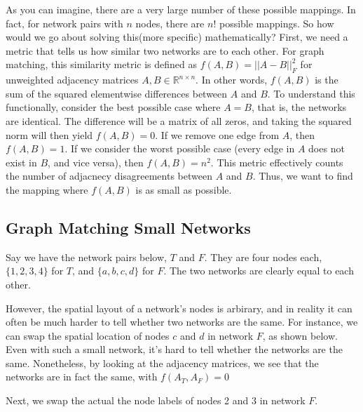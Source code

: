 \documentclass[letterpaper,10pt,english]{jupyterBook}
\begin{document}
\sphinxAtStartPar
As you can imagine, there are a very large number of these possible mappings. In fact, for network pairs with \(n\) nodes, there are \(n!\) possible mappings. So how would we go about solving this(more specific) mathematically? First, we need a metric that tells us how similar two networks are to each other. For graph matching, this similarity metric is defined as \(f(A, B) = ||A - B||_F^2\) for unweighted adjacency matrices \(A, B \in \mathbb{R}^{n \times n}\). In other words, \(f(A, B)\) is the sum of the squared elementwise differences between \(A\) and \(B\). To understand this functionally, consider the best possible case where \(A=B\), that is, the networks are identical. The difference will be a matrix of all zeros, and taking the squared norm will then yield \(f(A,B) = 0\). If we remove one edge from \(A\), then \(f(A,B) = 1\). If we consider the worst possible case (every edge in \(A\) does not exist in \(B\), and vice versa), then \(f(A,B) = n^2\). This metric effectively counts the number of adjacnecy disagreements between \(A\) and \(B\). Thus, we want to find the mapping where \(f(A, B)\) is as small as possible.


\subsection{Graph Matching Small Networks}
\label{\detokenize{applications/ch9/graph-matching-vertex:graph-matching-small-networks}}
\sphinxAtStartPar
Say we have the network pairs below, \(T\) and \(F\). They are four nodes each, \(\{1, 2, 3, 4\}\) for \(T\), and \(\{a, b, c, d\}\) for \(F\). The two networks are clearly equal to each other.

\sphinxAtStartPar
{}

\sphinxAtStartPar
However, the spatial layout of a network’s nodes is arbirary, and in reality it can often be much harder to tell whether two networks are the same. For instance, we can swap the spatial location of nodes \(c\) and \(d\) in network \(F\), as shown below. Even with such a small network, it’s hard to tell whether the networks are the same. Nonetheless, by looking at the adjacency matrices, we see that the networks are in fact the same, with \(f(A_T, A_F) = 0\)

\sphinxAtStartPar
{}



\sphinxAtStartPar
Next, we swap the actual the node labels of nodes 2 and 3 in network \(F\).
\end{document}
